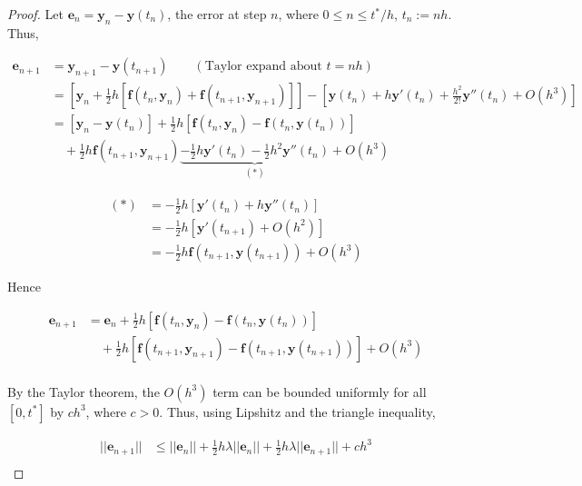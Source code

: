 \documentclass[a4paper]{article}
\begin{document}
\begin{proof}
	Let $ \mathbf{e}_{n} = \mathbf{y}_{n} - \mathbf{y}(t_{n}) $, the error at step $ n $, where $ 0 \leq n \leq t^{*} / h $, $ t_{n} := n h $. Thus,
	
	\begin{align*}
	\mathbf{e}_{n+1} & = \mathbf{y}_{n+1} - \mathbf{y}(t_{n+1}) \qquad (\text{Taylor expand about } t = nh) \\
	& = [  \mathbf{y}_{n} + \frac{1}{2} h [ \mathbf{f}(t_{n},\mathbf{y}_{n}) + \mathbf{f}(t_{n+1},\mathbf{y}_{n+1})  ] ] - [  \mathbf{y}(t_{n}) + h \mathbf{y}'(t_{n})  + \frac{h^{2}}{2!} \mathbf{y}''(t_{n}) + O(h^{3}) ] \\
	& = [ \mathbf{y}_{n} - \mathbf{y}(t_{n}) ] + \frac{1}{2} h [ \mathbf{f}(t_{n},\mathbf{y}_{n}) - \mathbf{f}(t_{n},\mathbf{y}(t_{n})) ] \\
	& \quad + \frac{1}{2} h \mathbf{f}(t_{n+1},\mathbf{y}_{n+1}) \underbrace{- \frac{1}{2} h \mathbf{y}'(t_{n}) - \frac{1}{2} h^{2} \mathbf{y}''(t_{n}) }_{(*)} + O(h^{3})
	\end{align*}
	
	\begin{align*}
	(*) & = - \frac{1}{2} h\left[  \mathbf{y}'(t_{n}) + h \mathbf{y}''(t_{n})  \right]  \\
	& = - \frac{1}{2} h\left[  \mathbf{y}'(t_{n+1}) + O(h^{2})  \right] \\
	& = - \frac{1}{2} h \mathbf{f}(t_{n+1},\mathbf{y}(t_{n+1})) + O(h^{3})
	\end{align*}
	
	
	Hence 
	
	\begin{align*}
	\mathbf{e}_{n+1} & = \mathbf{e}_{n} + \frac{1}{2} h [ \mathbf{f}(t_{n},\mathbf{y}_{n}) - \mathbf{f}(t_{n},\mathbf{y}(t_{n})) ]  \\
	& \quad + \frac{1}{2} h [ \mathbf{f}(t_{n+1},\mathbf{y}_{n+1}) - \mathbf{f}(t_{n+1},\mathbf{y}(t_{n+1})) ] + O(h^{3}) \\
	\end{align*}
	
	By the Taylor theorem, the $ O(h^{3}) $ term can be bounded uniformly for all $ [0,t^{*}] $ by $ ch^{3} $, where $ c > 0 $. Thus, using Lipshitz and the triangle inequality, 
	
	\begin{align*}
	| | \mathbf{e}_{n+1} | |  & \leq | | \mathbf{e}_{n} | |   + \frac{1}{2} h \lambda | |  \mathbf{e}_{n} | |  + \frac{1}{2} h \lambda | | \mathbf{e}_{n+1} | |  + ch^{3} \\
	\end{align*}
	

\end{proof}
\end{document}
